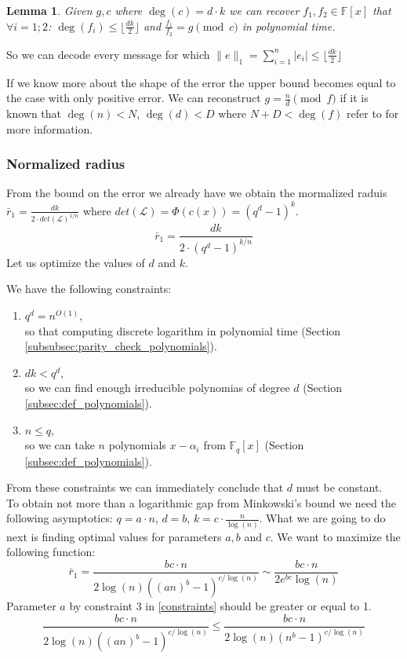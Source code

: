 \documentclass[12pt]{article}
\newcommand{\floor}[1]{\lfloor #1 \rfloor}
\newcommand{\FF}{\mathbb{F}}
\newtheorem{lemma}{Lemma}
\begin{document}
\begin{lemma}
Given $g,c$ where $\deg(c) = d \cdot k$ we can recover $f_{1}, f_{2} \in \mathbb{F}[x]$ that  $\forall i = 1;2$: $\deg(f_{i}) \leq \floor{\frac{dk}{2}}$ and $\frac{f_{1}}{f_{2}} = g \pmod{c}$ in polynomial time.
\end{lemma}

So we can decode every message for which $\|e\|_1 = \sum_{i =1}^{n} |e_i| \leq \floor{\frac{dk}{2}}$

If we know more about the shape of the error the upper bound becomes equal to the case with only positive error. We can reconstruct $g = \frac{n}{d} \pmod{f}$ if it is known that $\deg(n) < N$, $\deg(d) < D$ where $N + D < \deg(f)$ refer to \cite{[KM06]} for more information.


\subsubsection{Normalized radius}
\label{subsubsec:normalized_discrete_error}
From the bound on the error we already have we obtain the mormalized raduis $\bar{r}_1 = \frac{dk}{2 \cdot det(\mathcal{L})^{1/n}}$ where $det(\mathcal{L}) = \Phi(c(x)) = (q^{d} - 1)^{k}$.
\[
\bar{r}_1 = \frac{dk}{2 \cdot (q^{d} - 1)^{k/n}}
\]
Let us optimize the values of $d$ and $k$.

We have the following constraints:
\begin{enumerate}\label{constraints}
    \item $q^d = n^{O(1)}$, \\
    so that computing discrete logarithm in polynomial time (Section \ref{subsubsec:parity_check_polynomials}).
    \item $dk < q^{d}$, \\
    so we can find enough irreducible polynomias of degree $d$ (Section \ref{subsec:def_polynomials}).
    \item $n \leq q$, \\
    so we can take $n$ polynomials $x - \alpha_i$ from $\FF_q[x]$ (Section \ref{subsec:def_polynomials}).
\end{enumerate}
From these constraints we can immediately conclude that $d$ must be constant. \\

To obtain not more than a logarithmic gap from Minkowski's bound we need the following asymptotics: $q = a \cdot n$, $d = b$, $k =  c \cdot \frac{n}{\log(n)}$. What we are going to do next is finding optimal values for parameters $a, b$ and $c$. We want to maximize the following function:
\[
\bar{r}_1 = \frac{bc \cdot n}{2\log(n)((an)^{b} - 1)^{c/\log(n)}}  \sim \frac{bc \cdot n}{2e^{bc}\log(n)}
\]
 Parameter $a$ by constraint 3 in \ref{constraints} should be greater or equal to 1.
 \[
    \frac{bc \cdot n}{2\log(n)((an)^{b} - 1)^{c/\log(n)}} \leq \frac{bc \cdot n}{2\log(n)(n^{b} - 1)^{c/\log(n)}}
 \]
\end{document}
